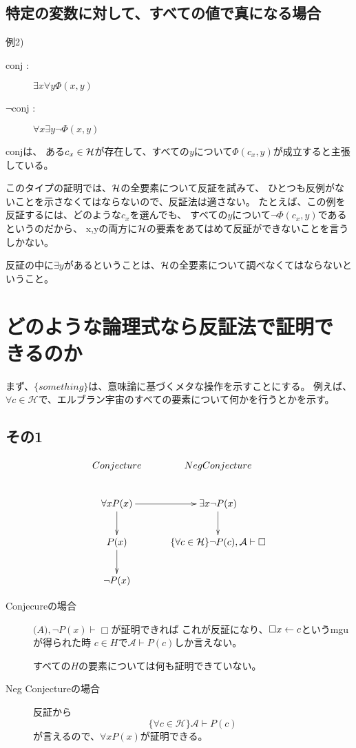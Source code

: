 \documentclass[10pt, onecolumn]{jarticle}   	%
\begin{document}
\subsection{特定の変数に対して、すべての値で真になる場合}
例2)
\begin{description}
\item[ conj :] $\exists x \forall y \Phi(x,y)$
\item[ $\neg$conj :]  $\forall x \exists y \neg \Phi(x,y)$
\end{description}

conjは、
ある$c_x \in \mathcal{H}$が存在して、すべての$y$について$\Phi(c_x, y)$が成立すると主張している。

このタイプの証明では、$\mathcal{H}$の全要素について反証を試みて、
ひとつも反例がないことを示さなくてはならないので、反証法は適さない。
たとえば、この例を反証するには、どのような$c_x$を選んでも、
すべての$y$について$\neg \Phi(c_x, y)$であるというのだから、
x,yの両方に$\mathcal{H}$の要素をあてはめて反証ができないことを言うしかない。

反証の中に$\exists y$があるということは、$\mathcal{H}$の全要素について調べなくてはならないということ。


\section{どのような論理式なら反証法で証明できるのか}

まず、$\{something\}$は、意味論に基づくメタな操作を示すことにする。
例えば、$\forall c \in \mathcal{H}$で、エルブラン宇宙のすべての要素について何かを行うとかを示す。

\subsection{その1}
$$
\xymatrix{
Conjecture & Neg Conjecture \\
\forall x P(x) \ar[d] \ar[r]& \exists x\neg{P(x)}\ar[d] \\
P(x) \ar[d]& \{\forall c \in \mathcal{H}\} \neg{P(c)}, \mathcal{A} \vdash \Box \\
\neg{P(x)} 
}
$$

\begin{description}
\item[Conjecureの場合] $\mathcal(A), \neg P(x) \vdash \Box$が証明できれば
これが反証になり、$\Box x \leftarrow c$というmguが得られた時
$c \in H$で$\mathcal{A}\vdash P(c)$しか言えない。

すべての$H$の要素については何も証明できていない。

\item[Neg Conjectureの場合]反証から
$$\{\forall c \in \mathcal{H}\} \mathcal{A} \vdash P(c)$$
が言えるので、$\forall x P(x)$が証明できる。

\end{description}
\end{document}
